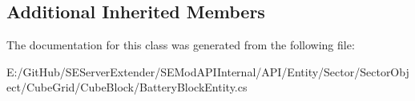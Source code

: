 \subsection*{Additional Inherited Members}


The documentation for this class was generated from the following file\+:\begin{DoxyCompactItemize}
\item 
E\+:/\+Git\+Hub/\+S\+E\+Server\+Extender/\+S\+E\+Mod\+A\+P\+I\+Internal/\+A\+P\+I/\+Entity/\+Sector/\+Sector\+Object/\+Cube\+Grid/\+Cube\+Block/Battery\+Block\+Entity.\+cs\end{DoxyCompactItemize}
